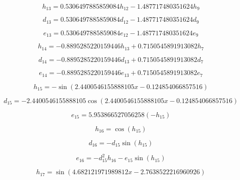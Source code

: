 \begin{equation}
h_{13}=0.5306497885859084 h_{12} - 1.487717480351624 h_{9}
\end{equation}


\begin{equation}
d_{13}=0.5306497885859084 d_{12} - 1.487717480351624 d_{9}
\end{equation}


\begin{equation}
e_{13}=0.5306497885859084 e_{12} - 1.487717480351624 e_{9}
\end{equation}


\begin{equation}
h_{14}=- 0.8895285220159446 h_{13} + 0.7150545891913082 h_{7}
\end{equation}


\begin{equation}
d_{14}=- 0.8895285220159446 d_{13} + 0.7150545891913082 d_{7}
\end{equation}


\begin{equation}
e_{14}=- 0.8895285220159446 e_{13} + 0.7150545891913082 e_{7}
\end{equation}


\begin{equation}
h_{15}=- \sin{\left(2.4400546155888105 x - 0.124854066857516 \right)}
\end{equation}


\begin{equation}
d_{15}=- 2.4400546155888105 \cos{\left(2.4400546155888105 x - 0.124854066857516 \right)}
\end{equation}


\begin{equation}
e_{15}=5.953866527056258 (-h_{15})
\end{equation}


\begin{equation}
h_{16}=\cos{\left(h_{15} \right)}
\end{equation}


\begin{equation}
d_{16}=- d_{15} \sin{\left(h_{15} \right)}
\end{equation}


\begin{equation}
e_{16}=- d_{15}^{2} h_{16} - e_{15} \sin{\left(h_{15} \right)}
\end{equation}


\begin{equation}
h_{17}=\sin{\left(4.682121971989812 x - 2.7638522216960926 \right)}
\end{equation}


